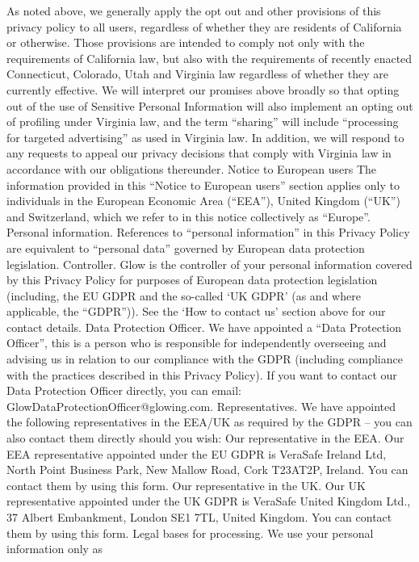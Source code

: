 As noted above, we generally apply the opt out and other provisions of
this privacy policy to all users, regardless of whether they are residents
of California or otherwise. Those provisions are intended to comply not
only with the requirements of California law, but also with the
requirements of recently enacted Connecticut, Colorado, Utah and
Virginia law regardless of whether they are currently effective. We will
interpret our promises above broadly so that opting out of the use of
Sensitive Personal Information will also implement an opting out of
profiling under Virginia law, and the term “sharing” will include
“processing for targeted advertising” as used in Virginia law. In addition,
we will respond to any requests to appeal our privacy decisions that
comply with Virginia law in accordance with our obligations thereunder.
Notice to European users
The information provided in this “Notice to European users” section
applies only to individuals in the European Economic Area (“EEA”),
United Kingdom (“UK”) and Switzerland, which we refer to in this notice
collectively as “Europe”.
Personal information. References to “personal information” in this
Privacy Policy are equivalent to “personal data” governed by European
data protection legislation.
Controller. Glow is the controller of your personal information covered
by this Privacy Policy for purposes of European data protection
legislation (including, the EU GDPR and the so-called ‘UK GDPR’ (as and
where applicable, the “GDPR”)). See the ‘How to contact us’ section
above for our contact details.
Data Protection Officer. We have appointed a “Data Protection Officer”,
this is a person who is responsible for independently overseeing and
advising us in relation to our compliance with the GDPR (including
compliance with the practices described in this Privacy Policy). If you
want to contact our Data Protection Officer directly, you can
email: GlowDataProtectionOfficer@glowing.com.
Representatives. We have appointed the following representatives in
the EEA/UK as required by the GDPR – you can also contact them
directly should you wish:
Our representative in the EEA. Our EEA representative appointed under
the EU GDPR is VeraSafe Ireland Ltd, North Point Business Park, New
Mallow Road, Cork T23AT2P, Ireland.
You can contact them by using this form.
Our representative in the UK. Our UK representative appointed under the
UK GDPR is VeraSafe United Kingdom Ltd., 37 Albert Embankment,
London SE1 7TL, United Kingdom.
You can contact them by using this form.
Legal bases for processing. We use your personal information only as
